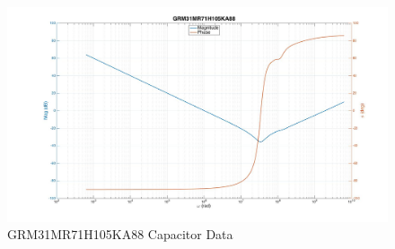 \begin{figure}[ht!]
\includegraphics[keepaspectratio=true,width=6in]{./figures/regression/exCapData.jpg}
\centering
\caption{GRM31MR71H105KA88 Capacitor Data~\cite{simSurfing}}
\label{fig:exCapData}
\end{figure}
